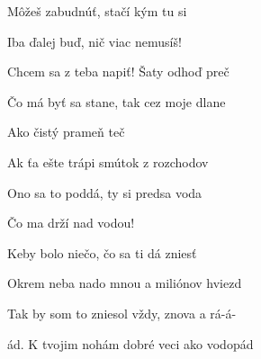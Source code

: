 \begin{song}
 Môžeš zabudnúť,  stačí kým tu si \par
{} Iba ďalej buď,  nič viac nemusíš! \par
{}
\bigskip

\begin{chorusbox}{\Refren}
Chcem sa z teba napiť!  Šaty odhoď preč  \par
Čo má byť sa stane, tak cez moje dlane  \par
Ako čistý prameň teč   \par
Ak ťa ešte trápi  smútok z rozchodov  \par
Ono sa to poddá, ty si predsa voda  \par
Čo ma drží nad vodou!   \par
\end{chorusbox}

\bigskip

 Keby bolo niečo,  čo sa ti dá zniesť \par
{} Okrem neba nado mnou a  miliónov hviezd  \par
{} Tak by som to zniesol  vždy, znova a rá-á- \par
{}ád. K tvojim nohám dobré veci  ako vodopád  \par
{} \par

\bigskip

\Refren

\bigskip

\Refren\ 

\end{song}
